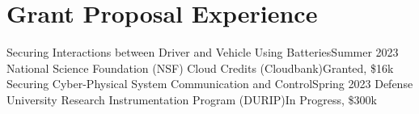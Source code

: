 \section{Grant Proposal Experience}
  \CVSubHeadingListStart
    \CVSubheading
      {Securing Interactions between Driver and Vehicle Using Batteries}{Summer 2023}
      {National Science Foundation (NSF) Cloud Credits (Cloudbank)}{Granted, \$16k}
    \CVSubheading
      {Securing Cyber-Physical System Communication and Control}{Spring 2023}
      {Defense University Research Instrumentation Program (DURIP)}{In Progress, \$300k}
  \CVSubHeadingListEnd